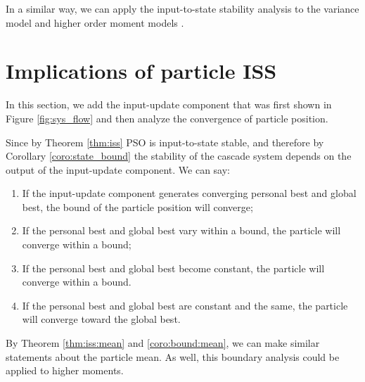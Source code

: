 \documentclass{sig-alternate}
\begin{document}
In a similar way, we can apply the input-to-state stability analysis to the variance model \cite{Jiang20078} and higher order moment models \cite{Poli:2007:EAS:1276958.1276977}.

\section{Implications of particle ISS}
\label{sec:sys_dynamics}


In this section, we add the input-update component that was first shown in Figure \ref{fig:sys_flow} and then analyze the convergence of particle position.


Since by Theorem \ref{thm:iss} PSO is input-to-state stable, and therefore by Corollary \ref{coro:state_bound} the stability of the cascade system depends on the output of the input-update component. 
We can say:
\begin{enumerate}
\item If the input-update component generates converging personal best and global best, the bound of the particle position will converge;
\item If the personal best and global best vary within a bound, the particle will converge within a bound;
\item If the personal best and global best become constant, the particle will converge within a bound.
\item If the personal best and global best are constant and the same, the particle will converge toward the global best.
\end{enumerate}
By Theorem \ref{thm:iss:mean} and \ref{coro:bound:mean}, we can make similar statements about the particle mean.
As well, this boundary analysis could be applied to higher moments.
\end{document}

